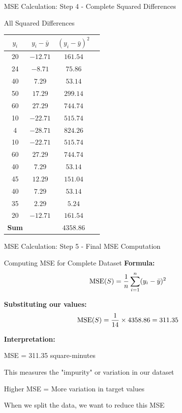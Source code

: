 \documentclass[usenames,dvipsnames]{beamer}
\begin{document}
\begin{frame}{MSE Calculation: Step 4 - Complete Squared Differences}
\begin{examplebox}{All Squared Differences}
\scriptsize
\begin{center}
\begin{tabular}{|c|c|c|c|}
\hline
\textbf{$y_i$} & \textbf{$y_i - \bar{y}$} & \textbf{$(y_i - \bar{y})^2$} \\ \hline
20 & $-12.71$ & $161.54$ \\
24 & $-8.71$ & $75.86$ \\
40 & $7.29$ & $53.14$ \\
50 & $17.29$ & $299.14$ \\
60 & $27.29$ & $744.74$ \\
10 & $-22.71$ & $515.74$ \\
4 & $-28.71$ & $824.26$ \\
10 & $-22.71$ & $515.74$ \\
60 & $27.29$ & $744.74$ \\
40 & $7.29$ & $53.14$ \\
45 & $12.29$ & $151.04$ \\
40 & $7.29$ & $53.14$ \\
35 & $2.29$ & $5.24$ \\
20 & $-12.71$ & $161.54$ \\ \hline
\textbf{Sum} & & $\mathbf{4358.86}$ \\
\hline
\end{tabular}
\end{center}
\end{examplebox}
\end{frame}

\begin{frame}{MSE Calculation: Step 5 - Final MSE Computation}
\scriptsize
\begin{examplebox}{Computing MSE for Complete Dataset}
\textbf{Formula:} 
\[
\operatorname{MSE}(S) = \frac{1}{n} \sum_{i=1}^{n} (y_i - \bar{y})^2
\]

\pause
\textbf{Substituting our values:}
\[
\operatorname{MSE}(S) = \frac{1}{14} \times 4358.86 = 311.35
\]

\pause
\textbf{Interpretation:}
\cleanitemize
{
	\item MSE = 311.35 square-minutes
	\item This measures the "impurity" or variation in our dataset
	\item Higher MSE = More variation in target values
	\item When we split the data, we want to reduce this MSE
}
\end{examplebox}
\end{frame}
\end{document}
